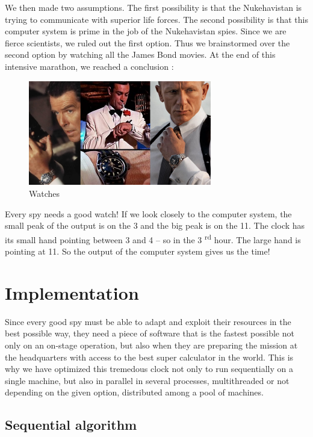 \documentclass[11pt,a4paper]{article}
\begin{document}
We then made two assumptions. The first possibility is that the Nukehavistan is trying to communicate with superior life forces. The second possibility is that this computer system is prime in the job of the Nukehavistan spies. Since we are fierce scientists, we ruled out the first option. Thus we brainstormed over the second option by watching all the James Bond movies. At the end of this intensive marathon, we reached a conclusion :

\begin{figure}[!h]
\centering
\includegraphics[width=8cm]{watches.png}
\caption{Watches}
\label{reverse}
\end{figure}

Every spy needs a good watch! If we look closely to the computer system, the small peak of the output is on the 3 and the big peak is on the 11. The clock has its small hand pointing between 3 and 4 -- so in the 3 \textsuperscript{rd} hour. The large hand is pointing at 11. So the output of the computer system gives us the time!

\section{Implementation}

Since every good spy must be able to adapt and exploit their resources in the best possible way, they need a piece of software that is the fastest possible not only on an on-stage operation, but also when they are preparing the mission at the headquarters with access to the best super calculator in the world. This is why we have optimized this tremedous clock not only to run sequentially on a single machine, but also in parallel in several processes, multithreaded or not depending on the given option, distributed among a pool of machines.

\subsection{Sequential algorithm}
\end{document}
